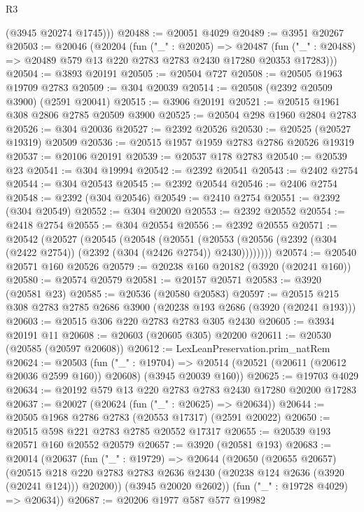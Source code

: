 \begin{lexlean}{R3}
\begin{coremodule}
        (@3945 @20274 @1745)))
@20488 := @20051 @4029
@20489 := @3951 @20267
@20503 := @20046
    (@20204
      (fun ("_" : @20205) =>
      @20487 (fun ("_" : @20488) => @20489 @579 @13 @220 @2783 @2783 @2430 @17280 @20353 @17283)))
@20504 := @3893 @20191
@20505 := @20504 @727
@20508 := @20505 @1963 @19709 @2783
@20509 := @304 @20039
@20514 := @20508 (@2392 @20509 @3900) (@2591 @20041)
@20515 := @3906 @20191
@20521 := @20515 @1961 @308 @2806 @2785 @20509 @3900
@20525 := @20504 @298 @1960 @2804 @2783
@20526 := @304 @20036
@20527 := @2392 @20526
@20530 := @20525 (@20527 @19319) @20509
@20536 := @20515 @1957 @1959 @2783 @2786 @20526 @19319
@20537 := @20106 @20191
@20539 := @20537 @178 @2783
@20540 := @20539 @23
@20541 := @304 @19994
@20542 := @2392 @20541
@20543 := @2402 @2754
@20544 := @304 @20543
@20545 := @2392 @20544
@20546 := @2406 @2754
@20548 := @2392 (@304 @20546)
@20549 := @2410 @2754
@20551 := @2392 (@304 @20549)
@20552 := @304 @20020
@20553 := @2392 @20552
@20554 := @2418 @2754
@20555 := @304 @20554
@20556 := @2392 @20555
@20571 := @20542
    (@20527
      (@20545
        (@20548
          (@20551
            (@20553 (@20556 (@2392 (@304 (@2422 @2754)) (@2392 (@304 (@2426 @2754)) @2430))))))))
@20574 := @20540 @20571 @160 @20526
@20579 := @20238 @160 @20182 (@3920 (@20241 @160))
@20580 := @20574 @20579
@20581 := @20157 @20571
@20583 := @3920 (@20581 @23)
@20585 := @20536 (@20580 @20583)
@20597 := @20515 @215 @308 @2783 @2785 @2686 @3900 (@20238 @193 @2686 (@3920 (@20241 @193)))
@20603 := @20515 @306 @220 @2783 @2783 @305 @2430
@20605 := @3934 @20191 @11
@20608 := @20603 (@20605 @305) @20200
@20611 := @20530 (@20585 (@20597 @20608))
@20612 := LexLeanPreservation.prim_natRem
@20624 := @20503
    (fun ("_" : @19704) =>
    @20514 (@20521 (@20611 (@20612 @20036 @2599 @160)) @20608) (@3945 @20039 @160))
@20625 := @19703 @4029
@20634 := @20192 @579 @13 @220 @2783 @2783 @2430 @17280 @20200 @17283
@20637 := @20027 (@20624 (fun ("_" : @20625) => @20634))
@20644 := @20505 @1968 @2786 @2783 (@20553 @17317) (@2591 @20022)
@20650 := @20515 @598 @221 @2783 @2785 @20552 @17317
@20655 := @20539 @193 @20571 @160 @20552 @20579
@20657 := @3920 (@20581 @193)
@20683 := @20014
    (@20637
      (fun ("_" : @19729) =>
      @20644
        (@20650
          (@20655 @20657)
          (@20515
            @218
            @220
            @2783
            @2783
            @2636
            @2430
            (@20238 @124 @2636 (@3920 (@20241 @124)))
            @20200))
        (@3945 @20020 @2602))
      (fun ("_" : @19728 @4029) => @20634))
@20687 := @20206 @1977 @587 @577 @19982

\end{coremodule}
\end{lexlean}
